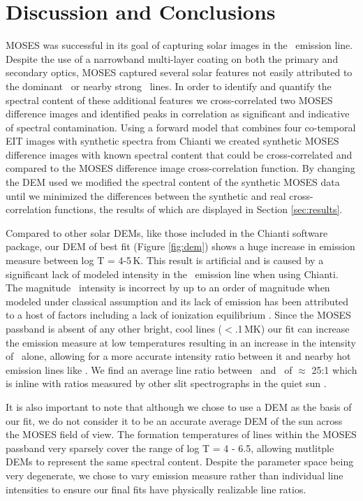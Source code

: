 	
\section{Discussion and Conclusions}\label{sec:conclusion}

	MOSES was successful in its goal of capturing solar images in the \heii \ emission line.
	Despite the use of a narrowband multi-layer coating on both the primary and secondary optics, MOSES captured several solar features not easily attributed to the dominant \heii \ or nearby strong \sixi \ lines.
	In order to identify and quantify the spectral content of these additional features we cross-correlated two MOSES difference images and identified peaks in correlation as significant and indicative of spectral contamination.
	Using a forward model that combines four co-temporal EIT images with synthetic spectra from Chianti we created synthetic MOSES difference images with known spectral content that could be cross-correlated and compared to the MOSES difference image cross-correlation function.
	By changing the DEM used we modified the spectral content of the synthetic MOSES data until we minimized the differences between the synthetic and real cross-correlation functions, the results of which are displayed in Section \ref{sec:results}.
	
	Compared to other solar DEMs, like those included in the Chianti software package, our DEM of best fit (Figure \ref{fig:dem}) shows a huge increase in emission measure between log T = 4-5\,K.
	This result is artificial and is caused by a significant lack of modeled intensity in the \heii \ emission line when using Chianti.
	The magnitude \heii\ intensity is incorrect by up to an order of magnitude when modeled under classical assumption and its lack of emission  has been attributed to a host of factors including a lack of ionization equilibrium \citep{Golding2017}.
	Since the MOSES passband is absent of any other bright, cool lines ($<$.1\,MK) our fit can increase the emission measure at low temperatures resulting in an increase in the intensity of \heii \ alone, allowing for a more accurate intensity ratio between it and nearby hot emission lines like \sixi.
	We find an average line ratio between \heii\ and \sixi\ of $\approx$ 25:1 which is inline with ratios measured by other slit spectrographs in the quiet sun \citep{Cushman1978}.
	
	It is also important to note that although we chose to use a DEM as the basis of our fit, we do not consider it to be an accurate average DEM of the sun across the MOSES field of view.
	The formation temperatures of lines within the MOSES passband very sparsely cover the range of log T = 4 - 6.5, allowing mutlitple DEMs to represent the same spectral content.
	Despite the parameter space being very degenerate, we chose to vary emission measure rather than individual line intensities to ensure our final fits have physically realizable line ratios.
	
